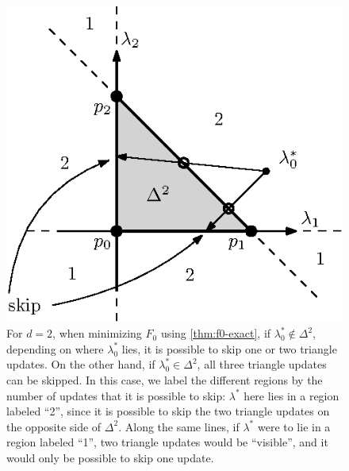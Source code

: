 \documentclass[eikonal.tex]{subfiles}
\begin{document}
\begin{figure}
  \centering
  \includegraphics[width=0.4\linewidth]{skip-zones.eps}
  \caption{For $d = 2$, when minimizing $F_0$ using
    \cref{thm:f0-exact}, if $\lambda^*_0 \notin \Delta^2$, depending
    on where $\lambda_0^*$ lies, it is possible to skip one or two
    triangle updates. On the other hand, if
    $\lambda_0^* \in \Delta^2$, all three triangle updates can be
    skipped. In this case, we label the different regions by the
    number of updates that it is possible to skip: $\lambda^*$ here
    lies in a region labeled ``2'', since it is possible to skip the
    two triangle updates on the opposite side of $\Delta^2$. Along the
    same lines, if $\lambda^*$ were to lie in a region labeled ``1'',
    two triangle updates would be ``visible'', and it would only be
    possible to skip one update.}\label{fig:skip-zones}
\end{figure}
\end{document}
